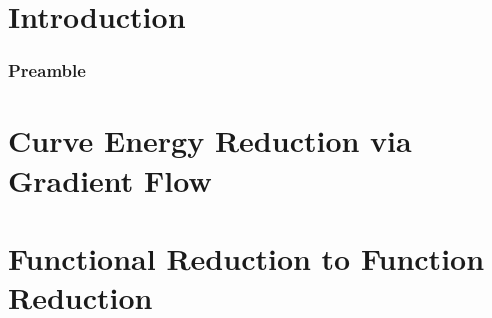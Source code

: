 \documentclass[a4paper, 12pt]{article}
\begin{document}



\tableofcontents

\part{Introduction}


\section{Preamble}


\newpage
\part{Curve Energy Reduction via Gradient Flow}

\newpage
\part{Functional Reduction to Function Reduction}

\printbibliography
\end{document}
